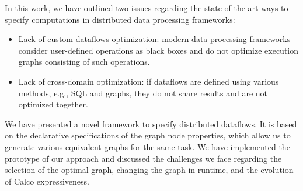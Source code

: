 In this work, we have outlined two issues regarding the state-of-the-art ways to specify computations in distributed data processing frameworks:
\begin{itemize}
    \item Lack of custom dataflows optimization: modern data processing frameworks consider user-defined operations as black boxes and do not optimize execution graphs consisting of such operations.
    \item Lack of cross-domain optimization: if dataflows are defined using various methods, e.g., SQL and graphs, they do not share results and are not optimized together.
\end{itemize}

We have presented a novel framework to specify distributed dataflows.
It is based on the declarative specifications of the graph node properties, which allow us to generate various equivalent graphs for the same task.
We have implemented the prototype of our approach and discussed the challenges we face regarding the selection of the optimal graph, changing the graph in runtime, and the evolution of Calco expressiveness.